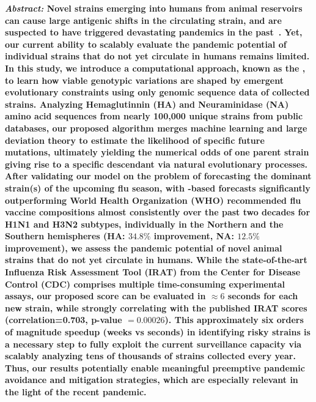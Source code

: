 \documentclass[onecolumn, compsoc,10pt]{IEEEtran}
\begin{document}
  

\maketitle

{\bf \sffamily \fontsize{10}{12}\selectfont \noindent   
  {\normalfont \itshape Abstract:} Novel \infl  strains emerging into humans from animal reservoirs can cause large antigenic shifts in the circulating strain, and  are suspected to have triggered devastating  pandemics in the past~\cite{shao2017evolution,mills2004transmissibility,reid2003origin,landolt2007up}. Yet, our current ability to  scalably  evaluate the pandemic potential of   individual strains that do not yet circulate in humans remains limited. In this study, we introduce a computational approach, known as the \enet,  to learn how viable genotypic variations are shaped by  emergent evolutionary constraints using only genomic sequence data of collected strains.    Analyzing    Hemaglutinnin (HA) and Neuraminidase (NA) amino acid sequences from nearly 100,000 unique \infl  strains from public  databases, our proposed algorithm merges machine learning and large deviation theory to  estimate the likelihood of  specific future  mutations, ultimately  yielding the  numerical odds of one parent strain giving rise to a specific descendant via natural evolutionary processes. After validating our model on the problem of forecasting the dominant strain(s) of the upcoming flu season, with \enet-based forecasts significantly outperforming World Health Organization (WHO) recommended flu vaccine compositions almost consistently over the past two decades for  H1N1 and H3N2 subtypes, individually in the Northern and the Southern hemispheres (HA: $34.8\% $ improvement, NA: $12.5\%$ improvement), we assess  the pandemic potential  of novel animal  strains that do not yet circulate in humans. While the state-of-the-art  Influenza Risk Assessment Tool (IRAT) from the Center for Disease Control (CDC) comprises multiple time-consuming experimental assays, our proposed \erisk score can be evaluated in $\approx 6$ seconds for each new strain, while strongly correlating with the published IRAT scores (correlation=0.703, p-value $= 0.00026$). This approximately six orders of magnitude speedup (weeks vs seconds) in  identifying risky strains is a necessary step to fully exploit the  current surveillance capacity via scalably analyzing tens of thousands of strains collected every year. Thus, our results potentially  enable  meaningful preemptive pandemic avoidance and mitigation strategies, which are especially relevant in the light of the recent pandemic.
}
  
\end{document}
